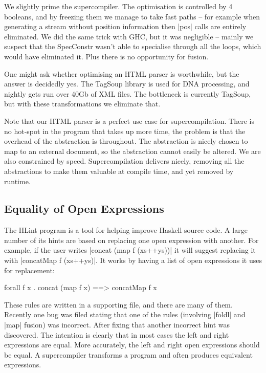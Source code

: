 \documentclass[draft]{sigplanconf}
\begin{document}
\begin{code}
We slightly prime the supercompiler. The optimisation is controlled by 4 booleans, and by freezing them we manage to take fast paths -- for example when generating a stream without position information then |pos| calls are entirely eliminated. We did the same trick with GHC, but it was negligible -- mainly we suspect that the SpecConstr wasn't able to specialise through all the loops, which would have eliminated it. Plus there is no opportunity for fusion.

One might ask whether optimising an HTML parser is worthwhile, but the answer is decidedly yes. The TagSoup library is used for DNA processing, and nightly gets run over 40Gb of XML files. The bottleneck is currently TagSoup, but with these transformations we eliminate that.

Note that our HTML parser is a perfect use case for supercompilation. There is no hot-spot in the program that takes up more time, the problem is that the overhead of the abstraction is throughout. The abstraction is nicely chosen to map to an external document, so the abstraction cannot easily be altered. We are also constrained by speed. Supercompilation delivers nicely, removing all the abstractions to make them valuable at compile time, and yet removed by runtime.

\subsection{Equality of Open Expressions}
\label{sec:hlint}

The HLint program \cite{hlint} is a tool for helping improve Haskell source code. A large number of its hints are based on replacing one open expression with another. For example, if the user writes |concat (map f (xs++ys))| it will suggest replacing it with |concatMap f (xs++ys)|. It works by having a list of open expressions it uses for replacement:

\begin{code}
forall f x . concat (map f x) ==> concatMap f x
\end{code}

These rules are written in a supporting file, and there are many of them. Recently one bug was filed stating that one of the rules (involving |foldl| and |map| fusion) was incorrect. After fixing that another incorrect hint was discovered. The intention is clearly that in most cases the left and right expressions are equal. More accurately, the left and right open expressions should be equal. A supercompiler transforms a program and often produces equivalent expressions.


\end{code}
\end{document}
